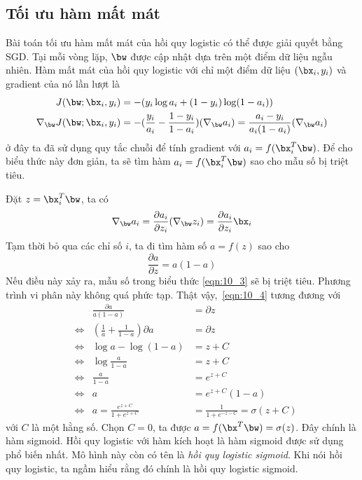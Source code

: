  
\subsection{Tối ưu hàm mất mát}
Bài toán tối ưu hàm mất mát của hồi quy logistic có thể được giải quyết bằng
SGD. Tại mỗi vòng lặp, $\bw$ được cập nhật dựa trên một điểm dữ liệu ngẫu
nhiên. Hàm mất mát của hồi quy logistic với chỉ một điểm dữ liệu $(\bx_i, y_i)$
và gradient của nó lần lượt là
\begin{align} 
J(\bw; \bx_i, y_i) &= -(y_i \log a_i + (1-y_i) \log (1 - a_i)) \\
\label{eqn:10_3}
\nabla_{\bw}J(\bw; \bx_i, y_i) 
&= -(\frac{y_i}{a_i} - \frac{1- y_i}{1 - a_i} ) (\nabla_{\bw}a_i)
= \frac{a_i - y_i}{a_i(1 - a_i)} (\nabla_{\bw}a_i)
\end{align} 
ở đây ta đã sử dụng quy tắc chuỗi để tính gradient với $a_i = f(\bx_i^T\bw)$. Để
cho biểu thức này đơn giản, ta sẽ tìm hàm
$a_i = f(\bx_i^T\bw)$ sao cho mẫu số bị triệt tiêu. 

Đặt $z = \bx_i^T\bw$, ta có
\begin{equation}
\label{eqn:10_4a}
\nabla_{\bw}a_i
 = \frac{\partial a_i}{\partial z_i} (\nabla_{\bw}z_i)= \frac{\partial a_i}{\partial
 z_i} \bx_i
\end{equation} 
Tạm thời bỏ qua các chỉ số $i$, ta đi tìm hàm số $a = f(z)$ sao cho
\begin{equation} 
\label{eqn:10_4}
\frac{\partial a}{\partial z} = a(1 - a) 
\end{equation} 
Nếu điều này xảy ra, mẫu số trong biểu thức \eqref{eqn:10_3} sẽ bị triệt tiêu. Phương trình vi phân này không quá phức tạp. 
Thật vậy,~\eqref{eqn:10_4} tương đương với
\begin{align*}
&                & \frac{\partial a}{a(1-a)}                 &=  \partial z \\
&\Leftrightarrow & \left(\frac{1}{a} + \frac{1}{1 - a}\right)\partial a &=  \partial z\\
&\Leftrightarrow  &\log a - \log(1 - a)                      &=  z + C \\
&\Leftrightarrow  &\log \frac{a}{1 - a}                      &=  z +C\\
&\Leftrightarrow  &\frac{a}{1 - a}                           &=  e^{z+C} \\
&\Leftrightarrow  &a                                         &=  e^{z+C} (1 - a) \\
&\Leftrightarrow  &a = \frac{e^{z+C}}{1 +e^{z+C}}                    &=  \frac{1}{1 + e^{-z-C}} = \sigma(z+C)
\end{align*}
với $C$ là một hằng số. Chọn $C = 0$, ta được $a = f(\bx^T\bw) =
\sigma(z)$. Đây chính là hàm sigmoid.
Hồi quy logistic với hàm kích hoạt là hàm sigmoid được sử dụng phổ biến nhất.
Mô hình này còn có tên là \textit{hồi quy logistic sigmoid}. Khi nói hồi quy logistic, ta ngầm hiểu rằng đó chính là hồi quy logistic sigmoid. 
 
